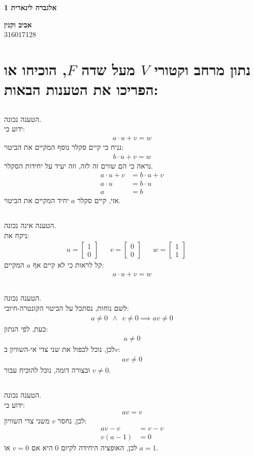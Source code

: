 \documentclass[a4paper, 12pt, leqno]{article}
\newcommand{\sub}[1]{\subsection{\underline{#1}}}
\newcommand{\eq}[1]{\begin{align*}#1\end{align*}}
\begin{document}
\begin{titlepage}
    \begin{center}
        \vspace*{4cm}
        {\fontsize{35pt}{35pt}\selectfont \textbf{אלגברה לינארית 1}}
        \vspace{0.4cm}

        {}
        \vfill

        {\Large\textbf{אביב וקנין}\\
        316017128}
    \end{center}
\end{titlepage}

\setcounter{section}{6}
\section{נתון מרחב וקטורי $V$ מעל שדה $F$, הוכיחו או הפריכו את הטענות הבאות:}
\sub{}
הטענה נכונה.\\
ידוע כי:
\eq{
    a\cdot{u}+v=w
}
נניח כי קיים סקלר נוסף המקיים את הביטוי:
\eq{
    b\cdot{u}+v=w
}
נראה כי הם שווים זה לזה, וזה יעיד על יחידות הסקלר.
\eq{
    a\cdot{u}+v&=b\cdot{u}+v\\
    a\cdot{u}&=b\cdot{u}\\
    a&=b
}
אזי, קיים סקלר $a$ יחיד המקיים את הביטוי.
\sub{}
הטענה אינה נכונה.\\
ניקח את:
\eq{
    u=\begin{bmatrix}1\\0\end{bmatrix}&&
    v=\begin{bmatrix}0\\0\end{bmatrix}&&
    w=\begin{bmatrix}1\\1\end{bmatrix}&&
}
קל לראות כי לא קיים אף $a$ המקיים:
\eq{
    a\cdot{u}+v=w
}
\sub{}
הטענה נכונה.\\
לשם נוחות, נסתכל על הביטוי הקונטרה-חיובי:
\eq{
    a\neq0~~\land~~v\neq0\implies{av}\neq0
}
כעת, לפי הנתון:
\eq{
    a\neq0
}
לכן, נוכל לכפול את שני צדי אי-השוויון ב$v$:
\eq{
    av\neq0
}
ובצורה דומה, נוכל להוכיח עבור $v\neq0$.
\sub{}
הטענה נכונה.\\
ידוע כי:
\eq{
    av=v
}
לכן, נחסר $v$ משני צדי השוויון:
\eq{
    av-v&=v-v\\
    v(a-1)&=0
}
לכן, האופציה היחידה לקיום 0 היא אם $v=0$ או $a=1$.

\setcounter{section}{13}
\end{document}
